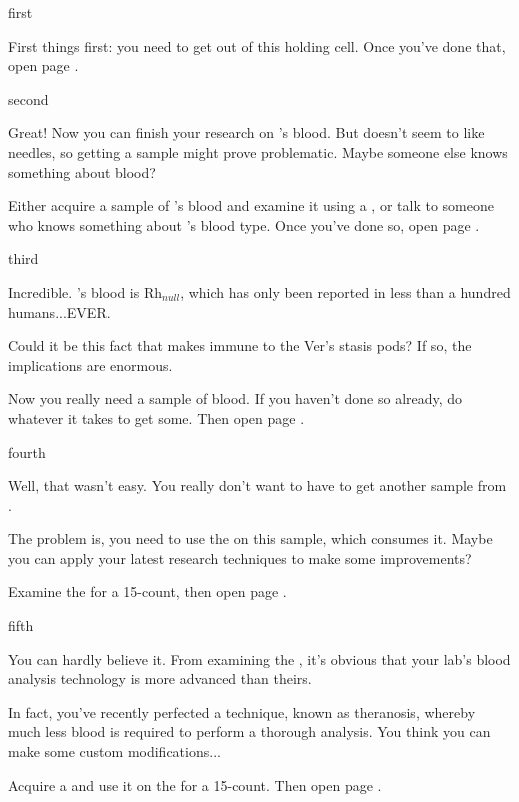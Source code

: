 \documentclass[greennotebook]{guildcamp4} %
\begin{document}
\startnotebook{\nSpiteNotebook{}}

\begin{page}{first}

First things first: you need to get out of this holding cell. Once you've done that, open page .

\end{page}

\begin{page}{second}

Great! Now you can finish your research on \cPlead{}'s blood. But  doesn't seem to like needles, so getting a sample might prove problematic. Maybe someone else knows something about  blood?

Either acquire a sample of \cPlead{}'s blood and examine it using a \iMicroscope{}, or talk to someone who knows something about \cPlead{}'s blood type. Once you've done so, open page .

\end{page}

\begin{page}{third}

Incredible. \cPlead{}'s blood is Rh$_{null}$, which has only been reported in less than a hundred humans...EVER.

Could it be this fact that makes \cPlead{} immune to the Ver's stasis pods? If so, the implications are enormous.

Now you really need a sample of  blood. If you haven't done so already, do whatever it takes to get some. Then open page .

\end{page}

\begin{page}{fourth}

Well, that wasn't easy. You really don't want to have to get another sample from \cPlead{}. 

The problem is, you need to use the \sBloodAnalyzer{} on this sample, which consumes it. Maybe you can apply your latest research techniques to make some improvements?

Examine the \sBloodAnalyzer{} for a 15-count, then open page .

\end{page}

\begin{page}{fifth}

You can hardly believe it. From examining the \sBloodAnalyzer{}, it's obvious that your lab's blood analysis technology is more advanced than theirs.

In fact, you've recently perfected a technique, known as theranosis, whereby much less blood is required to perform a thorough analysis. You think you can make some custom modifications...

Acquire a \iWrench{} and use it on the \sBloodAnalyzer{} for a 15-count. Then open page .

\end{page}
\end{document}
